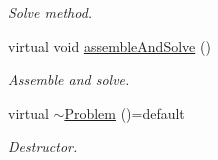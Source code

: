 \begin{DoxyCompactItemize}
\begin{DoxyCompactList}\small\item\em Solve method. \end{DoxyCompactList}\item 
virtual void \hyperlink{classFVCode3D_1_1Problem_a72274b4ba2677af6cda8e73ebb24c37a}{assemble\+And\+Solve} ()
\begin{DoxyCompactList}\small\item\em Assemble and solve. \end{DoxyCompactList}\item 
virtual \hyperlink{classFVCode3D_1_1Problem_a30e7d2b298fd12ff56e9c3027d3877b8}{$\sim$\+Problem} ()=default
\begin{DoxyCompactList}\small\item\em Destructor. \end{DoxyCompactList}\end{DoxyCompactItemize}
